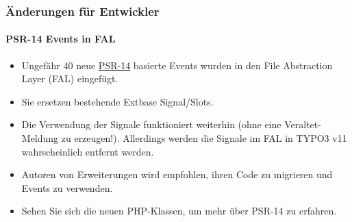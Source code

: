 \begin{frame}[fragile]
	\frametitle{Änderungen für Entwickler}
	\framesubtitle{PSR-14 Events in FAL}

	\lstset{basicstyle=\tiny\ttfamily}

	\begin{itemize}
		\item Ungefähr 40 neue
			\href{https://www.php-fig.org/psr/psr-14/}{PSR-14}
			basierte Events wurden in den File Abstraction Layer (FAL) eingefügt.
		\item Sie ersetzen bestehende Extbase Signal/Slots.
		\item Die Verwendung der Signale funktioniert weiterhin (ohne eine Veraltet-Meldung zu erzeugen!). Allerdings werden die Signale im FAL in TYPO3 v11 wahrscheinlich entfernt werden.
		\item Autoren von Erweiterungen wird empfohlen, ihren Code zu migrieren und Events zu verwenden.
		\item Sehen Sie sich die neuen PHP-Klassen, um mehr über PSR-14 zu erfahren.
	\end{itemize}

\end{frame}



